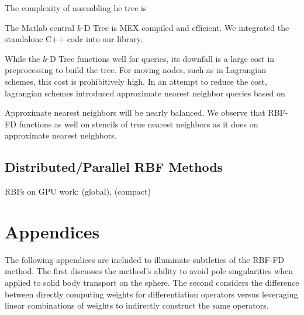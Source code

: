 \documentclass{report}
\begin{document}
{The complexity of assembling he tree is

The Matlab central $k$-D Tree is MEX compiled and efficient. We integrated the standalone C++ code into our library.  

While the $k$-D Tree functions well for queries, its downfall is a large cost in preprocessing to build the tree. For moving nodes, such as in Lagrangian schemes, this cost is prohibitively high. In an attempt to reduce the cost, lagrangian schemes introduced approximate nearest neighbor queries based on 

Approximate nearest neighbors will be nearly balanced. 
We observe that RBF-FD functions as well on stencils of true nearest neighbors as it does on approximate nearest neighbors. 



\chapter{Distributed/Parallel RBF Methods}
\label{chap:parallel_rbf} 

RBFs on GPU work: \cite{Schmidt2009a, Schmidt2009b} (global), \cite{Yokota2010} (compact)




}

\part{Appendices}
The following appendices are included to illuminate subtleties of the RBF-FD method. The first discusses the method's ability to avoid pole singularities when applied to solid body transport on the sphere. The second considers the difference between directly computing weights for differentiation operators versus leveraging linear combinations of weights to indirectly construct the same operators. 
\appendix



\ifstandalone


\end{document}
